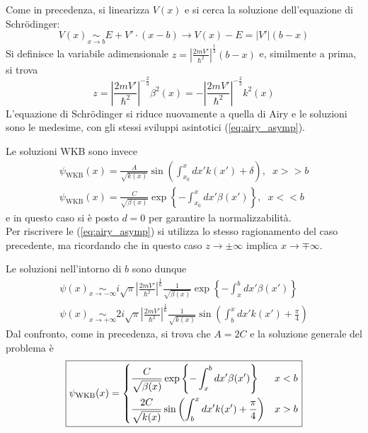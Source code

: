 Come in precedenza, si linearizza $V(x)$ e si cerca la soluzione dell'equazione di Schrödinger:
$$V(x)\underset{x\to b}\sim E+V'\cdot(x-b) \to V(x)-E = |V'|(b-x)$$
Si definisce la variabile adimensionale $z=\left|\frac{2mV'}{\hbar^2}\right|^{\frac{1}{3}}(b-x)$ e,
similmente a prima, si trova
$$z = \left|\frac{2mV'}{\hbar^2}\right|^{-\frac{2}{3}}\beta^2(x) =
-\left|\frac{2mV'}{\hbar^2}\right|^{-\frac{2}{3}}k^2(x) $$
L'equazione di Schrödinger si riduce nuovamente a quella di Airy e le soluzioni sono le medesime, con
gli stessi sviluppi asintotici (\ref{eq:airy_asymp}).

Le soluzioni WKB sono invece
\begin{gather*}
    \psi_\text{WKB}(x)=\frac{A}{\sqrt{k(x)}} \sin\left(\int_{x_0}^{x}dx'k(x')+\delta\right),\phantom{x}x>>b\\
    \psi_\text{WKB}(x) = \frac{C}{\sqrt{\beta(x)}}\exp\left\{-\int_{x_0}^{x}dx'\beta(x')\right\},\phantom{x}x<<b
\end{gather*}
e in questo caso si è posto $d=0$ per garantire la normalizzabilità.\\
Per riscrivere le (\ref{eq:airy_asymp}) si utilizza lo stesso ragionamento del caso precedente, ma
ricordando che in questo caso $z\to\pm\infty$ implica $x\to\mp\infty$.

Le soluzioni nell'intorno di $b$ sono dunque
\begin{gather*}
\psi(x)\underset{x\to-\infty}\sim
i\sqrt{\pi}\left|\frac{2mV'}{\hbar^2}\right|^{\frac{1}{6}}\frac{1}{\sqrt{\beta(x)}}
\exp\left\{-\int_{x}^{b}dx'\beta(x')\right\}\\
\psi(x)\underset{x\to+\infty}\sim
2i\sqrt{\pi}\left|\frac{2mV'}{\hbar^2}\right|^{\frac{1}{6}}\frac{1}{\sqrt{k(x)}}
\sin\left(\int_{b}^{x}dx'k(x') +\frac{\pi}{4}\right)
\end{gather*}
Dal confronto, come in precedenza, si trova che $A=2C$ e la soluzione generale del problema è
$$\boxed{
    \psi_\text{WKB}(x)=
    \begin{dcases}
	\frac{C}{\sqrt{\beta(x)}} \exp\left\{-\int_{x}^{b}dx'\beta(x')\right\} &x<b\\
	\frac{2C}{\sqrt{k(x)}} \sin\left(\int_{b}^{x}dx'k(x')+\frac{\pi}{4}\right) &x>b
    \end{dcases}
}$$
